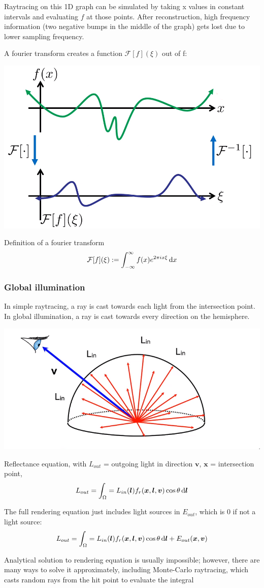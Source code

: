 \documentclass[12pt]{article}
\begin{document}
Raytracing on this 1D graph can be simulated by taking x values in
constant intervals and evaluating $f$ at those points. After reconstruction,
high frequency information (two negative bumps in the middle of the
graph) gets lost due to lower sampling frequency.

A fourier transform creates a function $\mathcal F [f](\xi)$ out of f:

\includegraphics[scale=.5]{images/fourier-f-to-F.png}

Definition of a fourier transform
\[ \mathcal F[f](\xi) := \int_{-\infty}^{\infty} f(x) e^{2\pi ix\xi} \mathop{}\!\mathrm{d} x \]

\subsubsection{Global illumination}

In simple raytracing, a ray is cast towards each light from the
intersection point. In global illumination, a ray is cast towards
every direction on the hemisphere.

\includegraphics[scale=.5]{images/reflectance-equation.png}

Reflectance equation, with $L_{out}$ = outgoing light in direction
$\bm v$, $\bm x$ = intersection point,
\[ L_{out} = \int_{\Omega} = L_{in}(\bm l) f_r(\bm x,\bm l,\bm v)
\cos\theta \mathop{}\!\mathrm{d} \bm l \]

The full rendering equation just includes light sources in $E_{out}$,
which is 0 if not a light source:
\[ L_{out} = \int_{\Omega} = L_{in}(\bm l) f_r(\bm x,\bm l,\bm v)
\cos\theta \mathop{}\!\mathrm{d} \bm l + E_{out}(\bm x,\bm v) \]

Analytical solution to rendering equation is usually impossible;
however, there are many ways to solve it approximately, including
Monte-Carlo raytracing, which casts random rays from the hit point
to evaluate the integral
\end{document}
